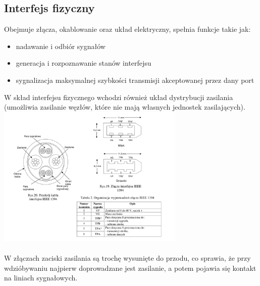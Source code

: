 \subsection{Interfejs fizyczny}
Obejmuje złącza, okablowanie  oraz układ elektryczny, spełnia funkcje takie jak:
\begin{itemize}
	\item nadawanie i odbiór sygnałów
	\item generacja i rozpoznawanie stanów interfejsu
	\item sygnalizacja maksymalnej szybkości transmisji akceptowanej przez dany port
\end{itemize}
W skład interfejsu fizycznego wchodzi również układ dystrybucji zasilania (umożliwia zasilanie węzłów, które nie mają własnych jednostek zasilających).\\
\includegraphics[width=9cm]{./wyklady/FIREWIRE_21_1.pdf}\\\\
W złączach zaciski zasilania są trochę wysunięte do przodu, co sprawia, że przy wdzióbywaniu najpierw doprowadzane jest zasilanie, a potem pojawia się kontakt na liniach sygnałowych.



